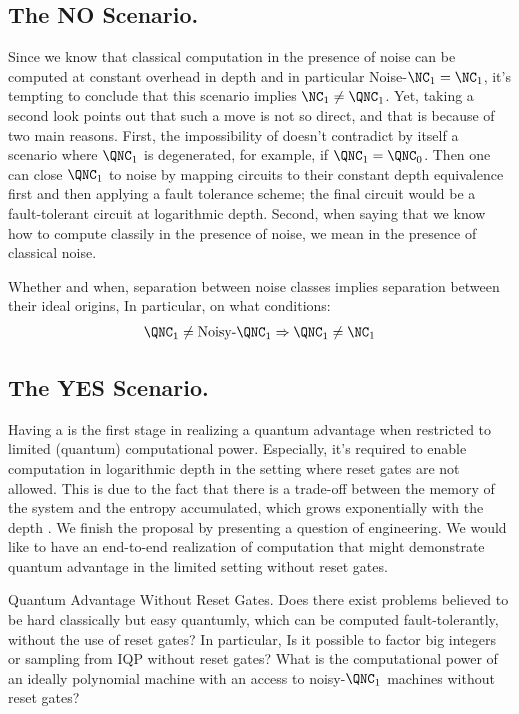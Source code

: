   \subsection{The NO Scenario.} 
  Since we know that classical computation in the presence of noise can be computed at constant overhead in depth and in particular Noise-$\NC_{1} = \NC_{1}$, it's tempting to conclude that this scenario implies $\NC_{1} \neq \QNC_{1}$. Yet, taking a second look points out that such a move is not so direct, and that is because of two main reasons. First, the impossibility of \CDO{} doesn't contradict by itself a scenario where $\QNC_{1}$ is degenerated, for example, if $\QNC_{1} = \QNC_{0}$. Then one can close $\QNC_{1}$ to noise by mapping circuits to their constant depth equivalence first and then applying a fault tolerance scheme; the final circuit would be a fault-tolerant circuit at logarithmic depth. 
  Second, when saying that we know how to compute classily in the presence of noise, we mean in the presence of classical noise.  

  \begin{oproblem}
    Whether and when, separation between noise classes implies separation between their ideal origins, In particular, on what conditions: 
    \begin{equation*}
      \begin{split}
        \QNC_{1} \neq \text{Noisy-}\QNC_{1} \Rightarrow \QNC_{1} \neq \NC_{1}
      \end{split}
    \end{equation*}
  \end{oproblem}

  \subsection{The YES Scenario.} 
Having a \CDO{} is the first stage in realizing a quantum advantage when restricted to limited (quantum) computational power. Especially, it's required to enable computation in logarithmic depth in the setting where reset gates are not allowed. This is due to the fact that there is a trade-off between the memory of the system and the entropy accumulated, which grows exponentially with the depth \cite{aharonov1999faulttolerant}. We finish the proposal by presenting a question of engineering. We would like to have an end-to-end realization of computation that might demonstrate quantum advantage in the limited setting without reset gates.

  \begin{oproblem}{Quantum Advantage Without Reset Gates.}
    Does there exist problems believed to be hard classically but easy quantumly, which can be computed fault-tolerantly, without the use of reset gates? In particular, Is it possible to factor big integers or sampling from IQP  without reset gates? What is the computational power of an ideally polynomial machine with an access to noisy-$\QNC_{1}$ machines without reset gates? 
  \end{oproblem}





